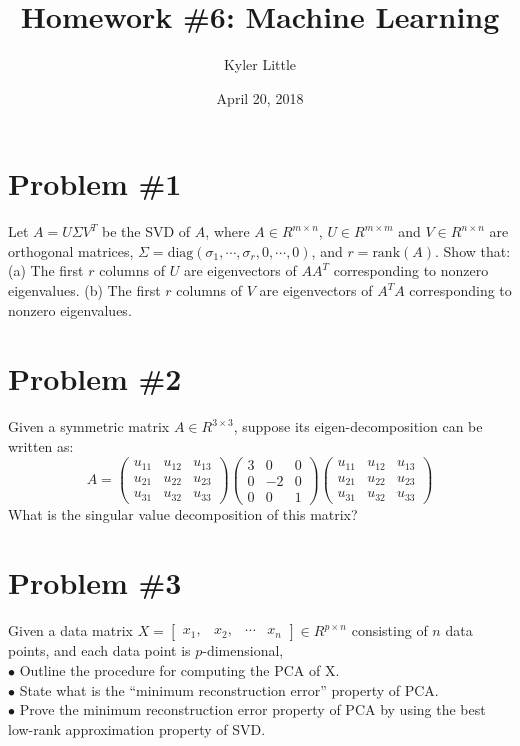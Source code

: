 \documentclass[12pt]{article}
\author{Kyler Little\vspace{-0.6cm}}
\title{Homework \#6: Machine Learning\vspace{-0.3cm}}
\date{April 20, 2018\vspace{-0.7cm}}
\begin{document}
	\maketitle
	\section*{Problem \#1}
	Let $A = U \Sigma V^T$ be the SVD of $A$, where $A \in R^{m\times n}$, $U \in R^{m\times m}$ and $V \in R^{n\times n}$
	are orthogonal matrices, $\Sigma = \text{diag}(\sigma_1 , \cdots, \sigma_r, 0, \cdots, 0)$, and $r = \text{rank}(A)$. Show that: \\
	(a) The first $r$ columns of $U$ are eigenvectors of $AA^T$ corresponding to nonzero eigenvalues.
	(b) The first $r$ columns of $V$ are eigenvectors of $A^TA$ corresponding to nonzero eigenvalues.
	
	\section*{Problem \#2}
	Given a symmetric matrix $A \in R^{3\times 3}$, suppose its eigen-decomposition can be written as:
	\begin{equation*}
		A =
		\left(
		\begin{array}{ccc}
		u_{11} & u_{12} & u_{13} \\
		u_{21} & u_{22} & u_{23} \\
		u_{31} & u_{32} & u_{33}
		\end{array}
		\right)
		\left(
		\begin{array}{ccc}
		3 & 0 & 0 \\
		0 & -2 & 0 \\
		0 & 0 & 1
		\end{array}
		\right)
		\left(
		\begin{array}{ccc}
		u_{11} & u_{12} & u_{13} \\
		u_{21} & u_{22} & u_{23} \\
		u_{31} & u_{32} & u_{33}
		\end{array}
		\right)
	\end{equation*}
	What is the singular value decomposition of this matrix?
		
	\section*{Problem \#3}
	Given a data matrix $X = \left[
	\begin{array}{cccc}
	x_1, & x_2, & \cdots & x_n
	\end{array}
	\right] \in R^{p \times n}$ consisting of $n$ data points, and each data point is $p$-dimensional, \\
	$\bullet$ Outline the procedure for computing the PCA of X.\\
	$\bullet$ State what is the “minimum reconstruction error” property of PCA. \\
	$\bullet$ Prove the minimum reconstruction error property of PCA by using the best low-rank
	approximation property of SVD.
	
\end{document}
